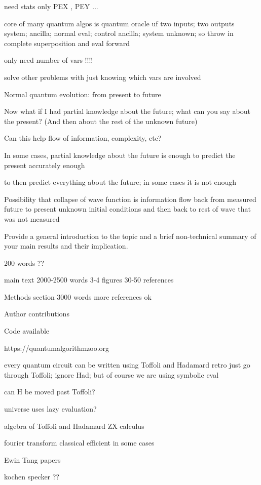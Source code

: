 \documentclass{article}
\begin{document}
need stats only
PEX , PEY ...

core of many quantum algos is quantum oracle uf
two inputs; two outputs
system; ancilla;
normal eval; control ancilla; system unknown; so throw in complete superposition and
eval forward

only need number of vars !!!!

solve other problems with just knowing which vars are involved

   Normal quantum evolution: from present to future

   Now what if I had partial knowledge about the future; what can you
   say about the present?  (And then about the rest of the unknown
   future)

   Can this help flow of information, complexity, etc?  

   In some cases, partial knowledge about the future is enough to
   predict the present accurately enough

   to then predict everything about the future; in some cases it is not enough

   Possibility that collapse of wave function is information flow back
   from measured future to present unknown initial conditions and then
   back to rest of wave that was not measured


Provide a general introduction to the topic and a brief non-technical
summary of your main results and their implication.

200 words ??

main text
  2000-2500 words
  3-4 figures
  30-50 references

Methods section
  3000 words
  more references ok
  
Author contributions

Code available  

https://quantumalgorithmzoo.org

every quantum circuit can be written using Toffoli and Hadamard
retro just go through Toffoli; ignore Had; but of course we are using symbolic eval

can H be moved past Toffoli?

universe uses lazy evaluation?

algebra of Toffoli and Hadamard
ZX calculus

fourier transform classical efficient in some cases

Ewin Tang papers

kochen specker ??

\end{document}
